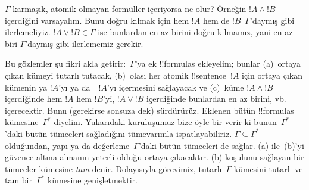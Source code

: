 $\Gamma$ karmaşık, atomik olmayan formüller içeriyorsa ne olur?
Örneğin $!A\land !B$ içerdiğini varsayalım. Bunu doğru kılmak için hem
$!A$ hem de $!B$~$\Gamma$'daymış gibi ilerlemeliyiz. $!A\lor !B\in
\Gamma$ ise bunlardan en az birini doğru kılmamız, yani en az biri
$\Gamma$'daymış gibi ilerlememiz gerekir.

Bu gözlemler şu fikri akla getirir:~$\Gamma$'ya ek !!{formula}s
ekleyelim; bunlar (a)~ortaya çıkan kümeyi tutarlı tutacak,
(b)~olası her atomik !!{sentence}~$!A$ için ortaya çıkan
kümenin ya $!A$'yı ya da $\lnot !A$'yı içermesini sağlayacak ve
(c)~küme $!A\land !B$ içerdiğinde hem $!A$ hem $!B$'yi, $!A\lor !B$
içerdiğinde bunlardan en az birini, vb. içerecektir. Bunu (gerekirse
sonsuza dek) sürdürürüz.
Eklenen bütün !!{formula}s kümesine~$\Gamma^*$ diyelim. Yukarıdaki
kuruluşumuz bize öyle bir
verir ki bunun~$\Gamma^*$'daki bütün tümceleri sağladığını tümevarımla
ispatlayabiliriz. $\Gamma\subseteq\Gamma^*$ olduğundan, yapı ya da
değerleme~$\Gamma$'daki bütün tümceleri de sağlar. (a) ile~(b)'yi
güvence altına almanın yeterli olduğu ortaya çıkacaktır. (b) koşulunu
sağlayan bir tümceler kümesine \emph{tam} denir. Dolayısıyla görevimiz,
tutarlı~$\Gamma$ kümesini tutarlı ve tam bir~$\Gamma^*$ kümesine
genişletmektir.

